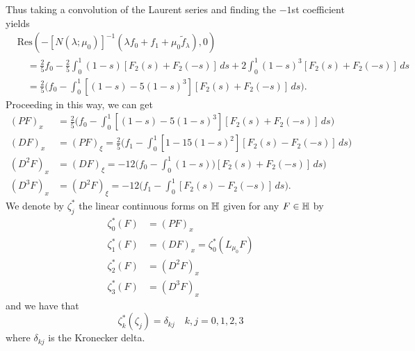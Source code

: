 Thus taking a convolution of the Laurent series and finding the \(-1\)st coefficient yields
\begin{equation*}
\begin{aligned}
	&\mathrm{Res}(-[N(\lambda;\mu_0)]^{-1}(\lambda f_0 + f_1 + \mu_0\tilde f_\lambda), 0)&\\
	&\quad= \frac 2 5 f_0 - \frac 2 5 \int_0^1 (1-s)[F_2(s) + F_2(-s)]\, ds + 2 \int_0^1 (1-s)^3[F_2(s) + F_2(-s)]\, ds \\
	&\quad =  \frac 2 5 \Bigg(  f_0 - \int_0^1[(1-s) - 5(1-s)^3][F_2(s) + F_2(-s)]\, ds \Bigg) .
\end{aligned}
\end{equation*}
Proceeding in this way, we can get  
\begin{align*}
	(PF)_x &= \frac 2 5 \Bigg(  f_0 - \int_0^1[(1-s) - 5(1-s)^3][F_2(s) + F_2(-s)]\, ds \Bigg) \\
	(DF)_x &= (PF)_\xi = \frac 2 5 \Bigg(  f_1 - \int_0^1[1 - 15(1-s)^2][F_2(s) - F_2(-s)]\, ds \Bigg) \\
	(D^2F)_x &= (DF)_\xi = -12 \Bigg( f_0 - \int_0^1(1-s)) [F_2(s) + F_2(-s)]\, ds \Bigg) \\
	(D^3F)_x &= (D^2 F)_\xi = -12 \Bigg(f_1 - \int_0^1 [F_2(s) - F_2(-s)]\, ds \Bigg).
\end{align*}
We denote by \(\zeta_j^*\) the linear continuous forms on \(\mathbb{H}\) given for any \(F\in\mathbb{H}\) by
\begin{equation*}
	\begin{aligned}
		\zeta_0^*(F)&= (PF)_x \\
		\zeta_1^*(F) &= (DF)_x  = \zeta_0^*(L_{\mu_0} F) \\
		\zeta_2^*(F) &= (D^2F)_x  \\
		\zeta_3^*(F) &= (D^3F)_x 
	\end{aligned}
\end{equation*}
and we have that
\begin{equation*}
	\zeta_k^*(\zeta_j) = \delta_{kj} \quad k,j = 0, 1, 2, 3
\end{equation*}
where \(\delta_{kj}\) is the Kronecker delta.

